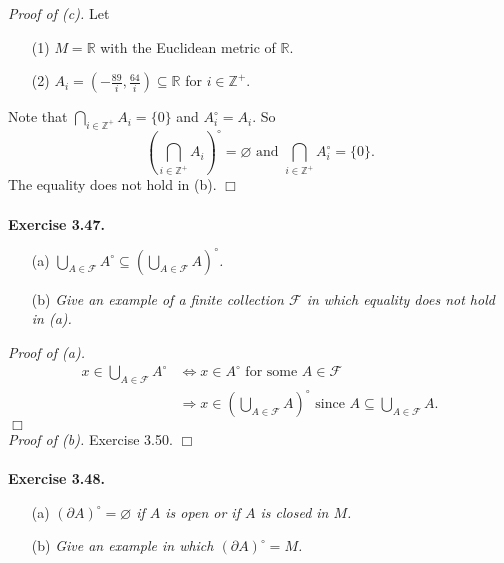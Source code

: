\documentclass{article}
\begin{document}
\emph{Proof of (c).}
Let
\begin{enumerate}
\item[(1)]
$M = \mathbb{R}$ with the Euclidean metric of $\mathbb{R}$.
\item[(2)]
$A_i = \left( -\frac{89}{i}, \frac{64}{i} \right) \subseteq \mathbb{R}$
for $i \in \mathbb{Z}^+$.
\end{enumerate}
Note that $\bigcap_{i \in \mathbb{Z}^+} A_i = \{ 0 \}$ and $A_i^{\circ} = A_i$.
So $$\left( \bigcap_{i \in \mathbb{Z}^+} A_i \right)^{\circ} = \varnothing
\text{ and } \bigcap_{i \in \mathbb{Z}^+} A_i^{\circ} = \{ 0 \}.$$
The equality does not hold in (b).
$\Box$ \\\\






\textbf{Exercise 3.47.}
\begin{enumerate}
\item[(a)]
\emph{$\bigcup_{A \in \mathscr{F}} A^{\circ}
\subseteq
\left( \bigcup_{A \in \mathscr{F}} A \right)^{\circ}$. }
\item[(b)]
\emph{Give an example of a finite collection $\mathscr{F}$
in which equality does not hold in (a). } \\
\end{enumerate}

\emph{Proof of (a).}
\begin{align*}
x \in \bigcup_{A \in \mathscr{F}} A^{\circ}
&\Longleftrightarrow
x \in A^{\circ} \text{ for some } A \in \mathscr{F} \\
&\Longrightarrow
x \in \left( \bigcup_{A \in \mathscr{F}} A \right)^{\circ}
\text{ since } A \subseteq \bigcup_{A \in \mathscr{F}} A.
\end{align*}
$\Box$ \\

\emph{Proof of (b).}
Exercise 3.50.
$\Box$ \\\\






\textbf{Exercise 3.48.}
\begin{enumerate}
\item[(a)]
\emph{$(\partial A)^{\circ} = \varnothing$ if $A$ is open or if $A$ is closed in $M$. }
\item[(b)]
\emph{Give an example in which $(\partial A)^{\circ} = M$. } \\
\end{enumerate}
\end{document}
